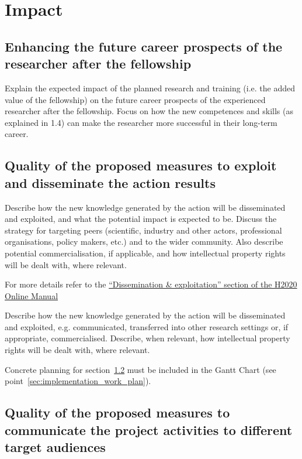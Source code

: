 \section{Impact}
\label{sec:impact}

\subsection{Enhancing the future career prospects of the
researcher after the fellowship}
  \label{sec:impact_researcher}

Explain the expected impact of the planned research and training
(i.e. the added value of the fellowship) on the future career
prospects of the experienced researcher after the fellowship.
Focus on how the new competences and skills (as explained in 1.4)
can make the researcher more successful in their long-term career.

\subsection{Quality of the proposed measures to exploit and
disseminate the action results}
  \label{sec:impact_dissemination}

Describe how the new knowledge generated by the action will be
disseminated and exploited, and what the potential impact is
expected to be. Discuss the strategy for targeting peers
(scientific, industry and other actors, professional
organisations, policy makers, etc.) and to the wider community.
Also describe potential commercialisation, if applicable, and how
intellectual property rights will be dealt with, where relevant.

\medskip\noindent
For more details refer to the
\href{http://ec.europa.eu/research/participants/docs/h2020-funding-guide/grants/grant-management/dissemination-of-results_en.htm}{``Dissemination
\& exploitation'' section of the H2020 Online Manual}

\medskip\noindent
Describe how the new knowledge generated by the action will be
disseminated and exploited, e.g. communicated, transferred into
other research settings or, if appropriate, commercialised.
Describe, when relevant, how intellectual property rights will be
dealt with, where relevant.

\medskip\noindent
Concrete planning for section~\ref{sec:impact_dissemination} must
be included in the Gantt Chart (see
point~\ref{sec:implementation_work_plan}).


\subsection{Quality of the proposed measures to communicate the
project activities to different target audiences}
\label{sec:impact_communication}

